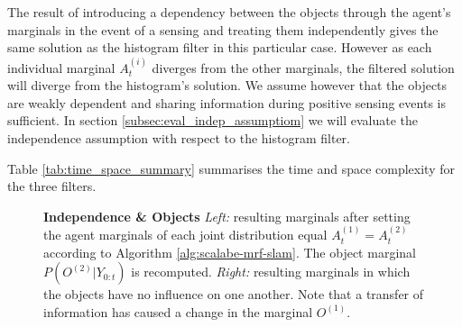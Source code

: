 The result of introducing a dependency between the objects through the agent's marginals in the event of a sensing and treating them
independently gives the same solution as the histogram filter in this particular case. However as each individual marginal $A^{(i)}_t$ diverges 
from the other marginals, the filtered solution will diverge from the histogram's solution. We assume however that the objects are weakly 
dependent and sharing information during positive sensing events is sufficient. In section \ref{subsec:eval_indep_assumptiom} we will 
evaluate the independence assumption with respect to the histogram filter.

Table \ref{tab:time_space_summary} summarises the time and space complexity for the three filters.%

\begin{figure}
  \centering
  \caption{\textbf{Independence \& Objects} \textit{Left:} resulting marginals after setting the agent marginals of each 
  joint distribution equal $A^{(1)}_t = A^{(2)}_t$ according to Algorithm \ref{alg:scalabe-mrf-slam}. The object marginal $P(O^{(2)}|Y_{0:t})$ is recomputed. 
  \textit{Right:} resulting marginals in which the objects have no influence on one another.
  Note that a transfer of information has caused a change in the marginal $O^{(1)}$.}
  \label{fig:independence_object}
\end{figure}



